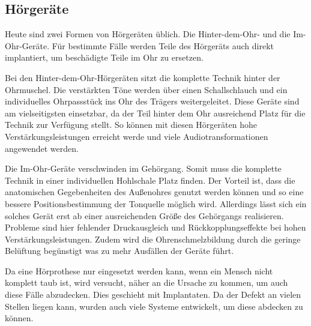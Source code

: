
\subsection{Hörgeräte}
\label{sec:Robin:topical:hearing_aid}
Heute sind zwei Formen von Hörgeräten üblich. Die Hinter-dem-Ohr- und die Im-Ohr-Geräte. Für
bestimmte Fälle werden Teile des Hörgeräts auch direkt implantiert, um beschädigte Teile im Ohr zu
ersetzen.

Bei den Hinter-dem-Ohr-Hörgeräten sitzt die komplette Technik hinter der Ohrmuschel. Die verstärkten
Töne werden über einen Schallschlauch und ein individuelles Ohrpassstück ins Ohr des Trägers
weitergeleitet. Diese Geräte sind am vielseitigsten einsetzbar, da der Teil hinter dem Ohr
ausreichend Platz für die Technik zur Verfügung stellt. So können mit diesen Hörgeräten hohe
Verstärkungsleistungen erreicht werde und viele Audiotransformationen angewendet werden.

Die Im-Ohr-Geräte verschwinden im Gehörgang. Somit muss die komplette Technik in einer individuellen
Hohlschale Platz finden. Der Vorteil ist, dass die anatomischen Gegebenheiten des Außenohres genutzt
werden können und so eine bessere Positionsbestimmung der Tonquelle möglich wird. Allerdings lässt
sich ein solches Gerät erst ab einer ausreichenden Größe des Gehörgangs realisieren. Probleme sind
hier fehlender Druckausgleich und Rückkopplungseffekte bei hohen Verstärkungsleistungen. Zudem wird
die Ohrenschmelzbildung durch die geringe Belüftung begünstigt was zu mehr Ausfällen der Geräte
führt.

Da eine Hörprothese nur eingesetzt werden kann, wenn ein Mensch nicht komplett taub ist, wird
versucht, näher an die Ursache zu kommen, um auch diese Fälle abzudecken. Dies geschieht mit
Implantaten. Da der Defekt an vielen Stellen liegen kann, wurden auch viele Systeme entwickelt, um
diese abdecken zu können.

